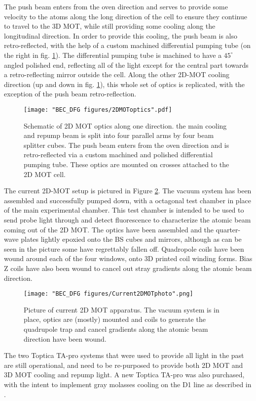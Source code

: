 The push beam enters from the oven direction and serves to provide some velocity to the atoms along the long direction of the cell to ensure they continue to travel to the 3D MOT, while still providing some cooling along the longitudinal direction. In order to provide this cooling, the push beam is also retro-reflected, with the help of a custom machined differential pumping tube (on the right in fig.  \ref{fig:2DMOToptics}). The differential pumping tube is machined to have a $45^{\circ}$ angled polished end, reflecting all of the light except for the central part towards a retro-reflecting mirror outside the cell. Along the other 2D-MOT cooling direction (up and down in fig.  \ref{fig:2DMOToptics}), this whole set of optics is replicated, with the exception of the push beam retro-reflection.   

\begin{figure}
	\texttt{[image: "BEC\_DFG figures/2DMOToptics".pdf]}
\caption[Schematic of 2D MOT optics]{Schematic of 2D MOT optics along one direction. the main cooling and repump beam is split into four parallel arms by four beam splitter cubes. The push beam enters from the oven direction and is retro-reflected via a custom machined and polished differential pumping tube. These optics are mounted on crosses attached to the 2D MOT cell.}
\label{fig:2DMOToptics}
\end{figure}

The current 2D-MOT setup is pictured in Figure \ref{fig:Current2DMOTphoto}. The vacuum system has been assembled and successfully pumped down, with a octagonal test chamber in place of the main experimental chamber. This test chamber is intended to be used to send probe light through and detect fluorescence to characterize the atomic beam coming out of the 2D MOT. The optics have been assembled and the quarter-wave plates lightly epoxied onto the BS cubes and mirrors, although as can be seen in the picture some have regrettably fallen off. Quadropole coils have been wound around each of the four windows, onto 3D printed coil winding forms. Bias Z coils have also been wound to cancel out stray gradients along the atomic beam direction.
\begin{figure}
	\texttt{[image: "BEC\_DFG figures/Current2DMOTphoto".png]}
\caption[Picture of current 2D MOT apparatus]{Picture of current 2D MOT apparatus. The vacuum system is in place, optics are (mostly) mounted and coils to generate the quadrupole trap and cancel gradients along the atomic beam direction have been wound.  }
\label{fig:Current2DMOTphoto}
\end{figure}

The two Toptica TA-pro systems that were used to provide all \K{} light in the past are still operational, and need to be re-purposed to provide both 2D MOT and 3D MOT cooling and repump light. A new Toptica TA-pro was also purchased, with the intent to implement gray molasses cooling on the \K{} D1 line as described in \cite{Fernandes2012}. 
